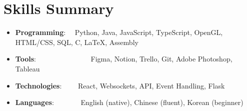 \documentclass[letter,10pt]{extarticle}
\newcommand{\resumeSkillItem}[2]{
	\item\small{
		\textbf{#1}{: #2 \vspace{-2pt}}
	}
}
\newcommand{\resumeSubItem}[2]{\resumeSkillItem{#1}{#2}\vspace{-5pt}}
\newcommand{\resumeSubHeadingListStart}{\begin{itemize}[leftmargin=0.15in,label={}]}
\newcommand{\resumeSubHeadingListEnd}{\end{itemize}}
\begin{document}
\section{Skills Summary}
	\resumeSubHeadingListStart
		\resumeSubItem{Programming}
			{\hspace{0.6mm}~~Python, Java, JavaScript, TypeScript, OpenGL, HTML/CSS, SQL, C, \LaTeX, Assembly}
		\resumeSubItem{Tools}
            {\hspace{0.3mm}~~~~~~~~~~~~~~~Figma, Notion, Trello, Git, Adobe
                Photoshop, Tableau}
		\resumeSubItem{Technologies}
			{~~~~React, Websockets, API, Event Handling, Flask}
        \resumeSubItem{Languages}
			{\hspace{0.6mm}~~~~~~~English (native), Chinese (fluent), Korean (beginner)}
	\resumeSubHeadingListEnd
\end{document}
